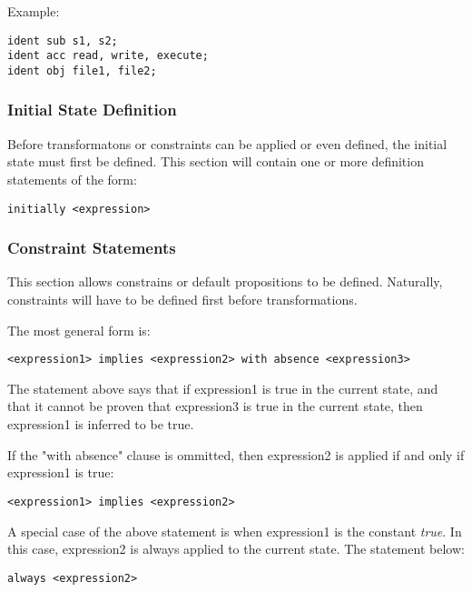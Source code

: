\documentclass[a4paper]{article}
\begin{document}
        Example:

\begin{verbatim}
ident sub s1, s2;
ident acc read, write, execute;
ident obj file1, file2;
\end{verbatim}

      \subsubsection{Initial State Definition}

        Before transformatons or constraints can be applied or even defined,
        the initial state must first be defined. This section will contain
        one or more definition statements of the form:

\begin{verbatim}
initially <expression>
\end{verbatim}

      \subsubsection{Constraint Statements}

        This section allows constrains or default propositions to be defined.
        Naturally, constraints will have to be defined first before
        transformations.

        The most general form is:

\begin{verbatim}
<expression1> implies <expression2> with absence <expression3>
\end{verbatim}

        The statement above says that if expression1 is true in the current
        state, and that it cannot be proven that expression3 is true in
        the current state, then expression1 is inferred to be true.

        If the "with absence" clause is ommitted, then expression2 is applied
        if and only if expression1 is true:

\begin{verbatim}
<expression1> implies <expression2>
\end{verbatim}

        A special case of the above statement is when expression1 is the
        constant \emph{true}. In this case, expression2 is always applied
        to the current state. The statement below:

\begin{verbatim}
always <expression2>
\end{verbatim}
\end{document}
